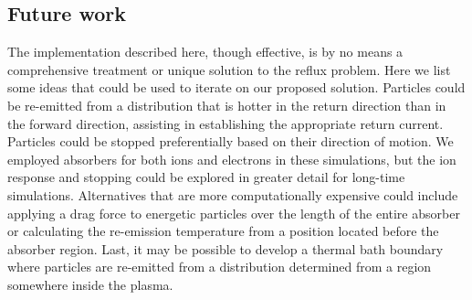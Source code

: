 \documentclass[../absorber.tex]{subfiles}
\begin{document}
\subsection{Future work}

The implementation described here, though effective, is by no means a comprehensive treatment or unique solution to the reflux problem.  Here we list some ideas that could be used to iterate on our proposed solution.  Particles could be re-emitted from a distribution that is hotter in the return direction than in the forward direction, assisting in establishing the appropriate return current.  Particles could be stopped preferentially based on their direction of motion.  We employed absorbers for both ions and electrons in these simulations, but the ion response and stopping could be explored in greater detail for long-time simulations.  Alternatives that are more computationally expensive could include applying a drag force to energetic particles over the length of the entire absorber or calculating the re-emission temperature from a position located before the absorber region.  Last, it may be possible to develop a thermal bath boundary where particles are re-emitted from a distribution determined from a region somewhere inside the plasma.
\end{document}
